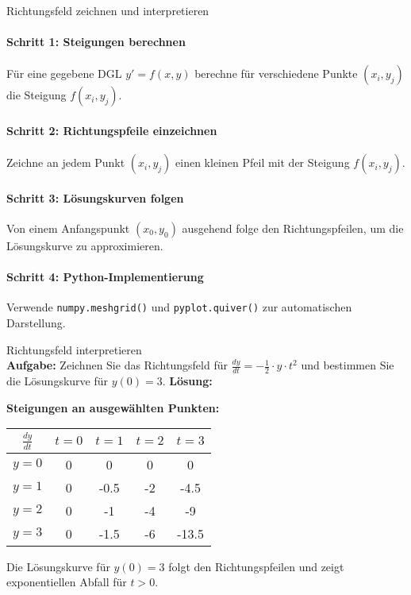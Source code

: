 \begin{KR}{Richtungsfeld zeichnen und interpretieren}
\paragraph{Schritt 1: Steigungen berechnen}
Für eine gegebene DGL $y' = f(x,y)$ berechne für verschiedene Punkte $(x_i, y_j)$ die Steigung $f(x_i, y_j)$.

\paragraph{Schritt 2: Richtungspfeile einzeichnen}
Zeichne an jedem Punkt $(x_i, y_j)$ einen kleinen Pfeil mit der Steigung $f(x_i, y_j)$.

\paragraph{Schritt 3: Lösungskurven folgen}
Von einem Anfangspunkt $(x_0, y_0)$ ausgehend folge den Richtungspfeilen, um die Lösungskurve zu approximieren.

\paragraph{Schritt 4: Python-Implementierung}
Verwende \texttt{numpy.meshgrid()} und \texttt{pyplot.quiver()} zur automatischen Darstellung.
\end{KR}

\begin{example2}{Richtungsfeld interpretieren}\\
\textbf{Aufgabe:} Zeichnen Sie das Richtungsfeld für $\frac{dy}{dt} = -\frac{1}{2} \cdot y \cdot t^2$ und bestimmen Sie die Lösungskurve für $y(0) = 3$.
\tcblower
\textbf{Lösung:}

\textbf{Steigungen an ausgewählten Punkten:}
\begin{center}
\begin{tabular}{|c|c|c|c|c|}
\hline
$\frac{dy}{dt}$ & $t=0$ & $t=1$ & $t=2$ & $t=3$ \\
\hline
$y=0$ & 0 & 0 & 0 & 0 \\
\hline
$y=1$ & 0 & -0.5 & -2 & -4.5 \\
\hline
$y=2$ & 0 & -1 & -4 & -9 \\
\hline
$y=3$ & 0 & -1.5 & -6 & -13.5 \\
\hline
\end{tabular}
\end{center}

Die Lösungskurve für $y(0) = 3$ folgt den Richtungspfeilen und zeigt exponentiellen Abfall für $t > 0$.
\end{example2}

